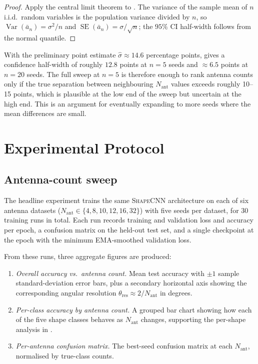 \documentclass[letterpaper,11pt,leqno]{article}
\begin{document}
\begin{proof}
Apply the central limit theorem to . The variance of the sample mean of $n$ i.i.d.\ random variables is the population variance divided by $n$, so $\operatorname{Var}(\bar a_n)=\sigma^2/n$ and $\operatorname{SE}(\bar a_n) = \sigma/\sqrt{n}$; the $95\%$ CI half-width follows from the normal quantile.\end{proof}

With the preliminary point estimate $\hat\sigma\approx 14.6$ percentage points,  gives a confidence half-width of roughly $12.8$ points at $n=5$ seeds and $\approx 6.5$ points at $n=20$ seeds. The full sweep at $n=5$ is therefore enough to rank antenna counts only if the true separation between neighbouring $N_{\mathrm{ant}}$ values exceeds roughly 10--15 points, which is plausible at the low end of the sweep but uncertain at the high end. This is an argument for eventually expanding to more seeds where the mean differences are small.

\section{Experimental Protocol}\label{s:protocol}

\subsection{Antenna-count sweep}

The headline experiment trains the same \textsc{ShapeCNN} architecture on each of six antenna datasets ($N_{\mathrm{ant}}\in\{4,8,10,12,16,32\}$) with five seeds per dataset, for 30 training runs in total. Each run records training and validation loss and accuracy per epoch, a confusion matrix on the held-out test set, and a single checkpoint at the epoch with the minimum EMA-smoothed validation loss.

From these runs, three aggregate figures are produced:
\begin{enumerate}
\item \emph{Overall accuracy vs.\ antenna count.} Mean test accuracy with $\pm 1$ sample standard-deviation error bars, plus a secondary horizontal axis showing the corresponding angular resolution $\theta_{\mathrm{res}}\approx 2/N_{\mathrm{ant}}$ in degrees.
\item \emph{Per-class accuracy by antenna count.} A grouped bar chart showing how each of the five shape classes behaves as $N_{\mathrm{ant}}$ changes, supporting the per-shape analysis in .
\item \emph{Per-antenna confusion matrix.} The best-seed confusion matrix at each $N_{\mathrm{ant}}$, normalised by true-class counts.
\end{enumerate}
\end{document}
